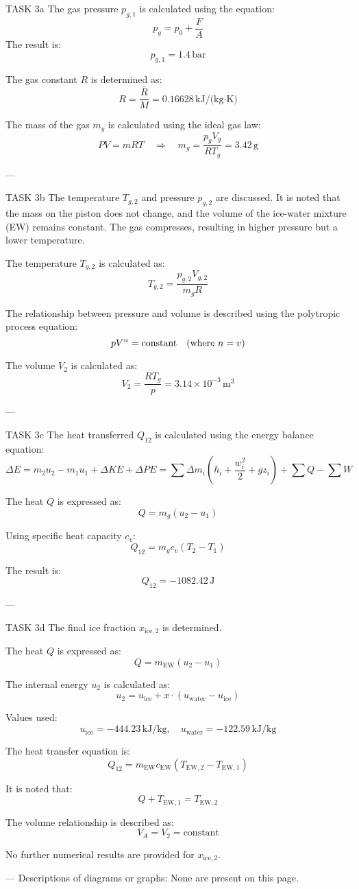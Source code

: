 TASK 3a  
The gas pressure \( p_{g,1} \) is calculated using the equation:  
\[
p_g = p_0 + \frac{F}{A}
\]  
The result is:  
\[
p_{g,1} = 1.4 \, \text{bar}
\]  

The gas constant \( R \) is determined as:  
\[
R = \frac{\bar{R}}{M} = 0.16628 \, \text{kJ/(kg·K)}
\]  

The mass of the gas \( m_g \) is calculated using the ideal gas law:  
\[
PV = mRT \quad \Rightarrow \quad m_g = \frac{p_g V_g}{R T_g} = 3.42 \, \text{g}
\]  

---

TASK 3b  
The temperature \( T_{g,2} \) and pressure \( p_{g,2} \) are discussed. It is noted that the mass on the piston does not change, and the volume of the ice-water mixture (EW) remains constant. The gas compresses, resulting in higher pressure but a lower temperature.  

The temperature \( T_{g,2} \) is calculated as:  
\[
T_{g,2} = \frac{p_{g,2} V_{g,2}}{m_g R}
\]  

The relationship between pressure and volume is described using the polytropic process equation:  
\[
p V^n = \text{constant} \quad \text{(where \( n = v \))}
\]  

The volume \( V_2 \) is calculated as:  
\[
V_2 = \frac{RT_g}{p} = 3.14 \times 10^{-3} \, \text{m}^3
\]  

---

TASK 3c  
The heat transferred \( Q_{12} \) is calculated using the energy balance equation:  
\[
\Delta E = m_2 u_2 - m_1 u_1 + \Delta KE + \Delta PE = \sum \Delta m_i \left( h_i + \frac{w_i^2}{2} + g z_i \right) + \sum Q - \sum W
\]  

The heat \( Q \) is expressed as:  
\[
Q = m_g (u_2 - u_1)
\]  

Using specific heat capacity \( c_v \):  
\[
Q_{12} = m_g c_v (T_2 - T_1)
\]  

The result is:  
\[
Q_{12} = -1082.42 \, \text{J}
\]  

---

TASK 3d  
The final ice fraction \( x_{\text{ice},2} \) is determined.  

The heat \( Q \) is expressed as:  
\[
Q = m_{\text{EW}} (u_2 - u_1)
\]  

The internal energy \( u_2 \) is calculated as:  
\[
u_2 = u_{\text{ice}} + x \cdot (u_{\text{water}} - u_{\text{ice}})
\]  

Values used:  
\[
u_{\text{ice}} = -444.23 \, \text{kJ/kg}, \quad u_{\text{water}} = -122.59 \, \text{kJ/kg}
\]  

The heat transfer equation is:  
\[
Q_{12} = m_{\text{EW}} c_{\text{EW}} (T_{\text{EW},2} - T_{\text{EW},1})
\]  

It is noted that:  
\[
Q + T_{\text{EW},1} = T_{\text{EW},2}
\]  

The volume relationship is described as:  
\[
V_A = V_2 = \text{constant}
\]  

No further numerical results are provided for \( x_{\text{ice},2} \).  

---  
Descriptions of diagrams or graphs: None are present on this page.